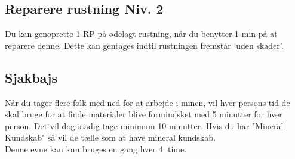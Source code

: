 \subsection*{Reparere rustning Niv. 2}
Du kan genoprette 1 RP på ødelagt rustning, når du benytter 1 min på at reparere denne. Dette kan gentages indtil rustningen fremstår 'uden skader'.\\

\subsection*{Sjakbajs}
Når du tager flere folk med ned for at arbejde i minen, vil hver persons tid de skal bruge for at finde materialer blive formindsket med 5 minutter for hver person. Det vil dog stadig tage minimum 10 minutter. Hvis du har "Mineral Kundskab" så vil de tælle som at have mineral kundskab.\\
Denne evne kan kun bruges en gang hver 4. time. 